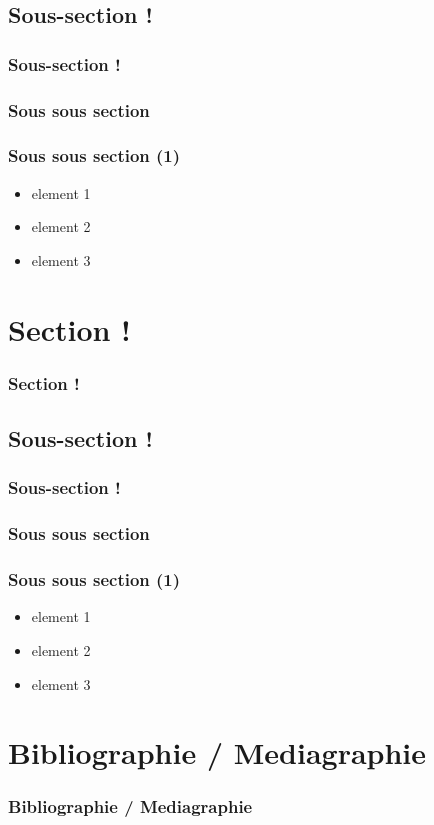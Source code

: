 \documentclass[slidetop,11pt]{beamer}
\begin{document}
\subsection{Sous-section !}
\begin{frame}
	\frametitle{Sous-section ! }
	\tableofcontents[sections=2,currentsection,subsectionstyle=show/shaded/hide]
\end{frame} 

\subsubsection{Sous sous section}
\begin{frame}
	\frametitle{Sous sous section  (1)}
	\begin{itemize}
		\item element 1
		\item element 2
		\item element 3
	\end{itemize}
\end{frame} 

\section{Section !}
\begin{frame}
	\frametitle{Section !}
	\tableofcontents[sections=3,currentsection,subsectionstyle=show/shaded/hide] %
\end{frame} 

\subsection{Sous-section !}
\begin{frame}
	\frametitle{Sous-section ! }
	\tableofcontents[sections=3,currentsection,subsectionstyle=show/shaded/hide]
\end{frame} 

\subsubsection{Sous sous section}
\begin{frame}
	\frametitle{Sous sous section  (1)}
	\begin{itemize}
		\item element 1
		\item element 2
		\item element 3
	\end{itemize}
\end{frame} 

\def\sectionPartBibliographie{Bibliographie / Mediagraphie}
\section{\sectionPartBibliographie}
\begin{frame}
	\frametitle{\sectionPartBibliographie}
	\nocite{*}
	
	
\end{frame}
\end{document}
